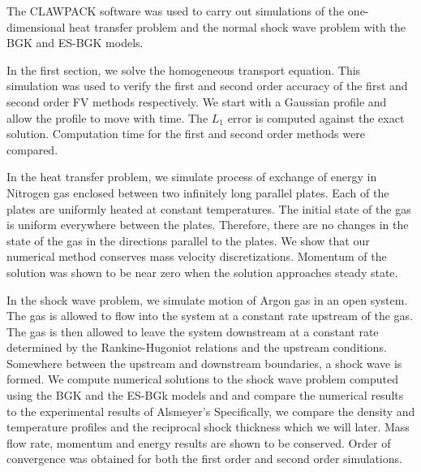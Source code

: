 The CLAWPACK software was used to carry out simulations of the one-dimensional heat transfer problem and the normal shock wave problem with the BGK and ES-BGK models.

In the first section, we solve the homogeneous transport equation. This simulation was used to verify the first and second order accuracy of the first and second order FV methods respectively. We start with a Gaussian profile and allow the profile to move with time. The $L_1$ error is computed against the exact solution. Computation time for the first and second order methods were compared.

In the heat transfer problem, we simulate process of exchange of energy in Nitrogen gas enclosed between two infinitely long parallel plates. Each of the plates are uniformly heated at constant temperatures. The initial state of the gas is uniform everywhere between the plates. Therefore, there are no changes in the state of the gas in the directions parallel to the plates. We show that our numerical method conserves mass velocity discretizations. Momentum of the solution was shown to be near zero when the solution approaches steady state.

In the shock wave problem, we simulate motion of Argon gas in an open system. The gas is allowed to flow into the system at a constant rate upstream of the gas. The gas is then allowed to leave the system downstream at a constant rate determined by the Rankine-Hugoniot relations \cite{roshko} and the upstream conditions. Somewhere between the upstream and downstream boundaries, a shock wave is formed. We compute numerical solutions to the shock wave problem computed using the BGK and the ES-BGk models and and compare the numerical results to the experimental results of Alsmeyer's \cite{alsmeyer} Specifically, we compare the density and temperature profiles and the reciprocal shock thickness which we will later. Mass flow rate, momentum and energy results are shown to be conserved. Order of convergence was obtained for both the first order and second order simulations.


